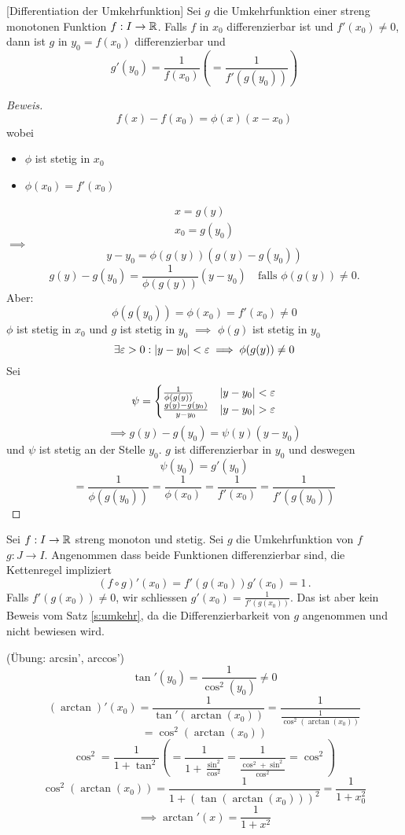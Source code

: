 \begin{Sat}\label{s:umkehr}[Differentiation der Umkehrfunktion]
  Sei $g$ die Umkehrfunktion einer streng monotonen Funktion $f:I\to\mathbb{R}$. 
Falls $f$ in $x_0$ differenzierbar ist und $f'(x_0)\neq 0$, 
dann ist $g$ in $y_0 = f(x_0)$ differenzierbar und
  \[g'(y_0)=\frac{1}{f(x_0)}\left( =\frac{1}{f'(g(y_0))} \right)\]
\end{Sat}
\begin{proof}[Beweis]
  \[f(x)-f(x_0)=\phi(x)(x-x_0)\]
  wobei
  \begin{itemize}
    \item $\phi$ ist stetig in $x_0$
    \item $\phi(x_0) = f'(x_0)$
  \end{itemize}
  \begin{eqnarray*}
    x=g(y)\\
    x_0=g(y_0)
  \end{eqnarray*}
  $\implies$
  \[y-y_0=\phi(g(y))(g(y)-g(y_0))\]
  \[g(y)-g(y_0)=\frac{1}{\phi(g(y))}( y - y_0) \quad \mbox{falls $\phi (g(y))\neq 0$.}\]
  Aber:
  \[\phi(g(y_0))=\phi(x_0)=f'(x_0)\neq 0\]
  $\phi$ ist stetig in $x_0$ und $g$ ist stetig in $y_0$ $\implies$ $\phi(g)$ ist stetig in $y_0$
  \[\exists\varepsilon>0: \mathopen| y-y_0 \mathclose|<\varepsilon\implies \phi(g(y))\neq 0\]
  Sei
  \[\psi = \begin{cases}
    \frac{1}{\phi(g(y))}&\abs{y-y_0}<\varepsilon\\
    \frac{g(y)-g(y_0)}{y-y_0}&\abs{y-y_0}>\varepsilon
  \end{cases}\]
  \[\implies g(y)-g(y_0)=\psi(y)(y-y_0)\]
  und $\psi$ ist stetig an der Stelle $y_0$. $g$ ist differenzierbar in $y_0$ und deswegen
  \[\psi(y_0)=g'(y_0)\]
  \[=\frac{1}{\phi(g(y_0))}=\frac{1}{\phi(x_0)}=\frac{1}{f'(x_0)}=\frac{1}{f'(g(y_0))}\]
\end{proof}
\begin{Bem}
  Sei $f:I\to\mathbb{R}$ streng monoton und stetig. Sei $g$ die Umkehrfunktion von $f$ $g:J\to I$.
 Angenommen dass beide Funktionen differenzierbar sind, die Kettenregel impliziert
  \[(f\circ g)'(x_0)=f'(g(x_0))g'(x_0)=1\, .\]
Falls $f' (g(x_0))\neq 0$, wir schliessen $g'(x_0)=\frac{1}{f'(g(x_0))}$. Das ist
aber kein Beweis vom Satz \ref{s:umkehr}, da die Differenzierbarkeit von $g$
angenommen und nicht bewiesen wird.
\end{Bem}
\begin{Bsp}
  (Übung: arcsin', arccos')
  \[\tan'(y_0)=\frac{1}{\cos^2(y_0)}\neq 0\]
  \[(\arctan)'(x_0)=\frac{1}{\tan'(\arctan(x_0))}=\frac{1}{\frac{1}{\cos^2(\arctan(x_0))}}\]
  \[=\cos^2(\arctan(x_0))\]
  \[\cos^2=\frac{1}{1+\tan^2}\left( =\frac{1}{1+\frac{\sin^2}{\cos^2}}=\frac{1}{\frac{\cos^2+\sin^2}{\cos^2}}=\cos^2 \right)\]
  \[\cos^2(\arctan(x_0))=\frac{1}{1+(\tan(\arctan(x_0)))^2}=\frac{1}{1+x_0^2}\]
  \[\implies \arctan'(x)=\frac{1}{1+x^2}\]
\end{Bsp}


